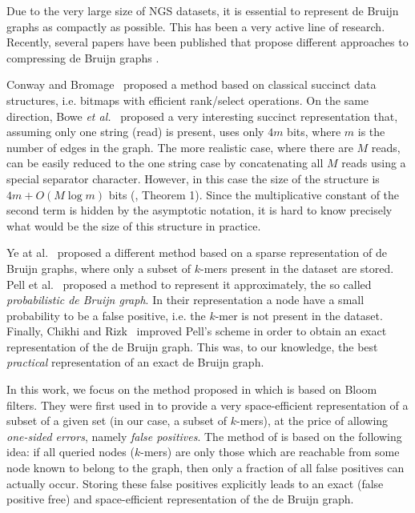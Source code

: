\documentclass[pdftex]{llncs}\usepackage[T1]{fontenc}
\begin{document}
Due to the very large size of NGS datasets, it is essential to
represent de Bruijn graphs as compactly as possible.  This has been a
very active line of research. Recently, several papers have been
published that propose different approaches to compressing de Bruijn
graphs
\cite{Conway15022011,YeAtAl-BMCBioinfo12,DBLP:conf/wabi/ChikhiR12,DBLP:conf/wabi/BoweOSS12,pmid22847406}.

Conway and Bromage~\cite{Conway15022011} proposed a method based on
classical succinct data structures, i.e. bitmaps with efficient
rank/select operations.  On the same direction, Bowe \emph{et
  al.}~\cite{DBLP:conf/wabi/BoweOSS12} proposed a very interesting
succinct representation that, assuming only one string (read) is
present, uses only $4m$ bits, where $m$ is the number of edges in the
graph. The more realistic case, where there are $M$ reads, can be
easily reduced to the one string case by concatenating all $M$ reads
using a special separator character. However, in this case the size of
the structure is $4m + O(M \log m)$ bits
(\cite{DBLP:conf/wabi/BoweOSS12}, Theorem 1). Since the multiplicative
constant of the second term is hidden by the asymptotic notation, it
is hard to know precisely what would be the size of this structure in
practice.

Ye at al.~\cite{YeAtAl-BMCBioinfo12} proposed a different method based
on a sparse representation of de Bruijn graphs, where only a subset of
$k$-mers present in the dataset are stored. Pell et
al.~\cite{pmid22847406} proposed a method to represent it
approximately, the so called \emph{probabilistic de Bruijn graph}. In
their representation a node have a small probability to be a false
positive, i.e. the $k$-mer is not present in the dataset. Finally,
Chikhi and Rizk~\cite{DBLP:conf/wabi/ChikhiR12} improved Pell's scheme
in order to obtain an exact representation of the de Bruijn
graph. This was, to our knowledge, the best \emph{practical}
representation of an exact de Bruijn graph.

In this work, we focus on the method proposed in
\cite{DBLP:conf/wabi/ChikhiR12} which is based on Bloom filters.  They
were first used in \cite{pmid22847406} to provide a very
space-efficient representation of a subset of a given set (in our
case, a subset of $k$-mers), at the price of allowing {\em one-sided
  errors}, namely {\em false positives}. The method of
\cite{DBLP:conf/wabi/ChikhiR12} is based on the following idea: if all
queried nodes ($k$-mers) are only those which are reachable from some
node known to belong to the graph, then only a fraction of all false
positives can actually occur. Storing these false positives explicitly
leads to an exact (false positive free) and space-efficient
representation of the de Bruijn graph.
\end{document}
